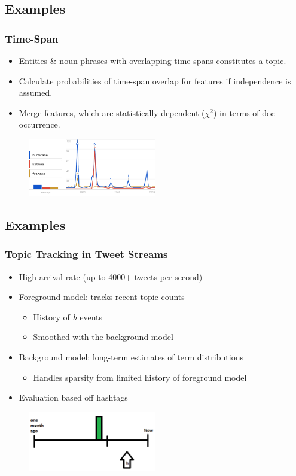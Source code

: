 \documentclass{beamer}
\begin{document}
\subsection{Examples}
\begin{frame}
	\frametitle{Time-Span \citep{Swan:1999:EST:319950.319956}}
	\begin{itemize}
		\item Entities \& noun phrases with overlapping time-spans constitutes a topic.
		\item Calculate probabilities of time-span overlap for features if independence is assumed.
		\item Merge features, which are statistically dependent ($\chi^2$) in terms of doc occurrence.
	\end{itemize}
	\begin{figure}[h]
		\centering
		\includegraphics[width=0.5\textwidth]{images/timespan.png}
	\end{figure}
\end{frame}

\subsection{Examples}
\begin{frame}
	\frametitle{Topic Tracking in Tweet Streams \citep{Lin:2011:STA:2020408.2020476}}
	\begin{itemize}
		\item High arrival rate (up to 4000+ tweets per second)
		\item Foreground model: tracks recent topic counts
			\begin{itemize}
				\item History of \emph{h} events
				\item Smoothed with the background model
			\end{itemize}
		\item Background model: long-term estimates of term distributions
			\begin{itemize}
				\item Handles sparsity from limited history of foreground model
			\end{itemize}
		\item Evaluation based off hashtags
	\end{itemize}
\begin{figure}[hb]
\centering
\includegraphics[width=0.5\textwidth]{images/twitter}
\end{figure}
\end{frame}
\end{document}
